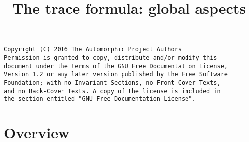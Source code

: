 

%

\newcommand{\TAG}{ZZZZ}

\title{The trace formula: global aspects}


\maketitle

\label{section-phantom}
\hypertarget{0700}{}
\reversemarginpar{}

\begin{verbatim}
Copyright (C) 2016 The Automorphic Project Authors
Permission is granted to copy, distribute and/or modify this
document under the terms of the GNU Free Documentation License,
Version 1.2 or any later version published by the Free Software
Foundation; with no Invariant Sections, no Front-Cover Texts,
and no Back-Cover Texts. A copy of the license is included in
the section entitled "GNU Free Documentation License".
\end{verbatim}

\tableofcontents


\section{Overview}
\label{section-overview}
\hypertarget{0701}{}
\reversemarginpar{}








